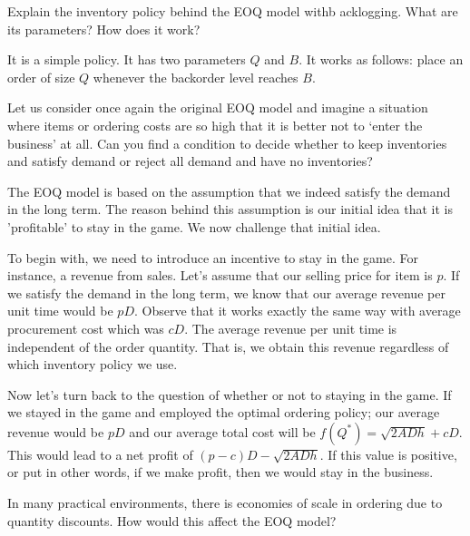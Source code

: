 \begin{question}
Explain the inventory policy behind the EOQ model withb acklogging. What are its parameters? How does it work?
\end{question}

  \begin{solution}
It is a simple policy. It has two parameters $Q$ and $B$. It works as follows: place an order of size $Q$ whenever the backorder level reaches $B$.
  \end{solution}


\begin{question}
  Let us consider once again the original EOQ model and imagine a situation where items or ordering
  costs are so high that it is better not to `enter the business' at
  all. Can you find a condition to decide whether to keep inventories
  and satisfy demand or reject all demand and have no inventories?
\end{question}

  \begin{solution}
  
	The EOQ model is based on the assumption that we indeed satisfy the demand in the long term. The reason behind this assumption is our initial idea that it is 'profitable' to stay in the game. We now challenge that initial idea. 
	
	To begin with, we need to introduce an incentive to stay in the game. For instance, a revenue from sales. Let's assume that our selling price for item is $p$. If we satisfy the demand in the long term, we know that our average revenue per unit time would be $pD$. Observe that it works exactly the same way with average procurement cost which was $cD$. The average revenue per unit time is independent of the order quantity. That is, we obtain this revenue regardless of which inventory policy we use. 
	
	Now let's turn back to the question of whether or not to staying in the game. If we stayed in the game and employed the optimal ordering policy; our average revenue would be $pD$ and our average total cost will be $f(Q^*)=\sqrt{2ADh}+cD$. This would lead to a net profit of $(p-c)D-\sqrt{2ADh}$. If this value is positive, or put in other words, if we make profit, then we would stay in the business. 
  \end{solution}


\begin{question}
In many practical environments, there is economies of scale in ordering due to quantity discounts. How would this affect the EOQ model?
\end{question}

